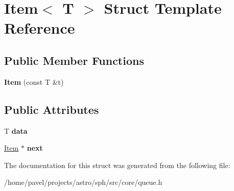 \hypertarget{structItem}{}\section{Item$<$ T $>$ Struct Template Reference}
\label{structItem}
\subsection*{Public Member Functions}
\begin{DoxyCompactItemize}
\item 
\hypertarget{structItem_a0bc1aa66bf861d07bf3b190aee366114}{}\label{structItem_a0bc1aa66bf861d07bf3b190aee366114} 
{\bfseries Item} (const T \&t)
\end{DoxyCompactItemize}
\subsection*{Public Attributes}
\begin{DoxyCompactItemize}
\item 
\hypertarget{structItem_aaf2c99522e556dfcaf4bbacf824802df}{}\label{structItem_aaf2c99522e556dfcaf4bbacf824802df} 
T {\bfseries data}
\item 
\hypertarget{structItem_af4be592e8a39472a1699c46ccc60cfa1}{}\label{structItem_af4be592e8a39472a1699c46ccc60cfa1} 
\hyperlink{structItem}{Item} $\ast$ {\bfseries next}
\end{DoxyCompactItemize}


The documentation for this struct was generated from the following file\+:\begin{DoxyCompactItemize}
\item 
/home/pavel/projects/astro/sph/src/core/queue.\+h\end{DoxyCompactItemize}
